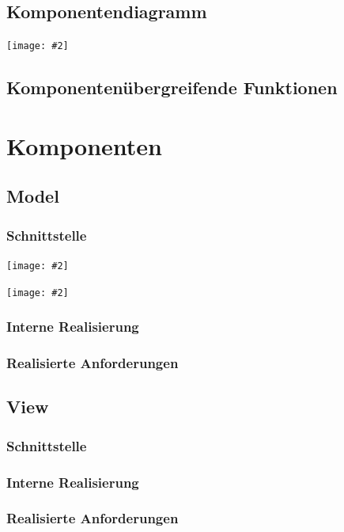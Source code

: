 \documentclass[11pt]{article}
\newcommand{\includediagram}[2]{
	\vspace{0.5cm}
	\begin{center}
		\texttt{[image: \#2]}
	\end{center}
	\vspace{0.5cm}
}
\begin{document}
\subsection{Komponentendiagramm}

\includediagram{0.7}{component-diagram.png}

\subsection{Komponentenübergreifende Funktionen}

\section{Komponenten}

\subsection{Model}

\subsubsection{Schnittstelle}

\includediagram{1.0}{model-main.png}

\includediagram{1.0}{model-undo.png}

\subsubsection{Interne Realisierung}

\subsubsection{Realisierte Anforderungen}

\subsection{View}

\subsubsection{Schnittstelle}

\subsubsection{Interne Realisierung}

\subsubsection{Realisierte Anforderungen}
\end{document}

